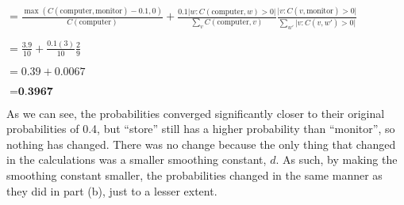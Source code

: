 \begin{solution}
$= \frac{\max(C(\text{computer}, \text{monitor}) - 0.1, 0)}{C(\text{computer})} + \frac{0.1 \vert w : C(\text{computer},w) > 0 \vert}{\sum_{v}C(\text{computer}, v)}\frac{\vert v : C(v, \text{monitor}) > 0\vert}{\sum_{w'} \vert v : C(v, w') > 0 \vert}$

$= \frac{3.9}{10} + \frac{0.1(3)}{10}\frac{2}{9}$

$= 0.39 + 0.0067$

$= \textbf{0.3967}$

As we can see, the probabilities converged significantly closer to their original probabilities of 0.4, but ``store'' still has a higher probability than ``monitor'', so nothing has changed. There was no change because the only thing that changed in the calculations was a smaller smoothing constant, $d$. As such, by making the smoothing constant smaller, the probabilities changed in the same manner as they did in part (b), just to a lesser extent.
\end{solution}